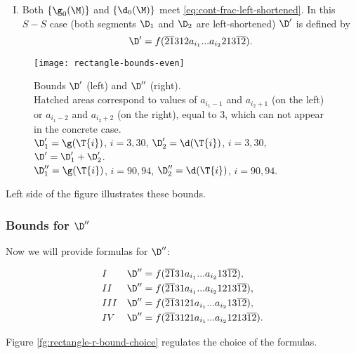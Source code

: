 \begin{enumerate}[I.]
	\item Both $\{\g_0(\M)\}$ and $\{\d_0(\M)\}$
	meet \ref{eq:cont-frac-left-shortened}.
	In this $S-S$ case
	(both segments $\D_1$ and $\D_2$ are left-shortened)
	$\D'$ is defined by
	\begin{equation}
		\D' = f(\overline{21}312a_{i_1}... a_{i_2}213\overline{12}).
	\end{equation}
\end{enumerate}

\begin{figure}[p]
	\centering
	\texttt{[image: rectangle-bounds-even]}
	\caption{
		Bounds $\D'$ (left) and $\D''$ (right).\\
		Hatched areas correspond to values of $a_{i_1 - 1}$ and $a_{i_2 + 1}$ (on the left)
		or $a_{i_1 - 2}$ and $a_{i_2 + 2}$ (on the right), equal to 3,
		which can not appear in the concrete case. \\
		$\D_1' = \g(\T{i})$, $i=3,30$,
		$\D_2' = \d  (\T{i})$, $i=3,30$,
		$\D' = \D_1' + \D_2'$. \\
		$\D_1'' = \g(\T{i})$, $i = 90, 94$,
		$\D_2'' = \d  (\T{i})$, $i = 90, 94$.
	}
	\label{fg:rectangle-bounds-even}
\end{figure}

Left side of the figure  illustrates these bounds.

\subsubsection{Bounds for $\D''$}
Now we will provide formulas for $\D''$:

\begin{subequations}
	\begin{align}
		\label{eq:bound-r-nnn}
		&&&&& I & \D'' & = f(\overline{21}31a_{i_1}... a_{i_2}13\overline{12}), &&&& \\
		\label{eq:bound-r-nns-ns}
		&&&&& II & \D'' & = f(\overline{21}31a_{i_1}... a_{i_2}1213\overline{12}), &&&& \\
		\label{eq:bound-r-ns}
		&&&&& III & \D'' & = f(\overline{21}3121a_{i_1}... a_{i_2}13\overline{12}), &&&& \\
		\label{eq:bound-r-sn}
		&&&&& IV & \D'' & = f(\overline{21}3121a_{i_1}... a_{i_2}1213\overline{12}). &&&&
	\end{align}
\end{subequations}

Figure \ref{fg:rectangle-r-bound-choice} regulates the choice of the formulas.

